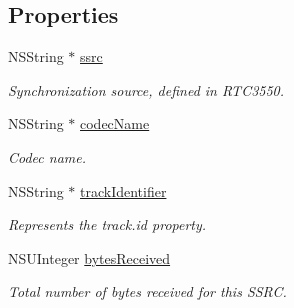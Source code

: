 \subsection*{Properties}
\begin{DoxyCompactItemize}
\item 
\mbox{\label{interface_c_c_video_receive_status_ad7f350fd1db43c653113eb84ba205140}} 
N\+S\+String $\ast$ \hyperlink{interface_c_c_video_receive_status_ad7f350fd1db43c653113eb84ba205140}{ssrc}
\begin{DoxyCompactList}\small\item\em Synchronization source, defined in R\+T\+C3550. \end{DoxyCompactList}\item 
\mbox{\label{interface_c_c_video_receive_status_ac7dac0b61a2caf609810e63cc8c76771}} 
N\+S\+String $\ast$ \hyperlink{interface_c_c_video_receive_status_ac7dac0b61a2caf609810e63cc8c76771}{codec\+Name}
\begin{DoxyCompactList}\small\item\em Codec name. \end{DoxyCompactList}\item 
\mbox{\label{interface_c_c_video_receive_status_a92dbf0e009d7cc7f145b1b538399bc7e}} 
N\+S\+String $\ast$ \hyperlink{interface_c_c_video_receive_status_a92dbf0e009d7cc7f145b1b538399bc7e}{track\+Identifier}
\begin{DoxyCompactList}\small\item\em Represents the track.\+id property. \end{DoxyCompactList}\item 
\mbox{\label{interface_c_c_video_receive_status_ae67f5a7e6c9e48e5059c95bed0d0c454}} 
N\+S\+U\+Integer \hyperlink{interface_c_c_video_receive_status_ae67f5a7e6c9e48e5059c95bed0d0c454}{bytes\+Received}
\begin{DoxyCompactList}\small\item\em Total number of bytes received for this S\+S\+RC. \end{DoxyCompactList}\item 
\mbox{\label{interface_c_c_video_receive_status_a144a42ba374c449d6e3f359e5d77ba05}} 

\end{DoxyCompactItemize}
